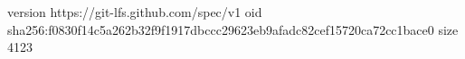 version https://git-lfs.github.com/spec/v1
oid sha256:f0830f14c5a262b32f9f1917dbccc29623eb9afadc82cef15720ca72cc1bace0
size 4123
